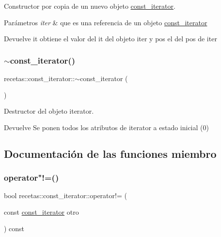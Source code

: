 Constructor por copia de un nuevo objeto \hyperlink{classrecetas_1_1const__iterator}{const\+\_\+iterator}. 


\begin{DoxyParams}{Parámetros}
{\em iter} & que es una referencia de un objeto \hyperlink{classrecetas_1_1const__iterator}{const\+\_\+iterator} \\
\hline
\end{DoxyParams}
\begin{DoxyReturn}{Devuelve}
it obtiene el valor del it del objeto iter y pos el del pos de iter 
\end{DoxyReturn}
\mbox{\label{classrecetas_1_1const__iterator_af765fa5516c55d7f59a182f26e9bdbf3}} 
\subsubsection{\texorpdfstring{$\sim$const\+\_\+iterator()}{~const\_iterator()}}
{\footnotesize\ttfamily recetas\+::const\+\_\+iterator\+::$\sim$const\+\_\+iterator (\begin{DoxyParamCaption}{ }\end{DoxyParamCaption})\hspace{0.3cm}{\ttfamily [inline]}}



Destructor del objeto iterator. 

\begin{DoxyReturn}{Devuelve}
Se ponen todos los atributos de iterator a estado inicial (0) 
\end{DoxyReturn}


\subsection{Documentación de las funciones miembro}
\mbox{\label{classrecetas_1_1const__iterator_a133a88a0de923966aa5decab75b47039}} 
\subsubsection{\texorpdfstring{operator"!=()}{operator!=()}}
{\footnotesize\ttfamily bool recetas\+::const\+\_\+iterator\+::operator!= (\begin{DoxyParamCaption}\item[{const \hyperlink{classrecetas_1_1const__iterator}{const\+\_\+iterator}}]{otro }\end{DoxyParamCaption}) const}



